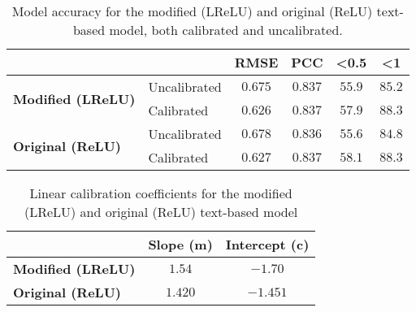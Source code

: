 \begin{table}[H]
    \centering
    \begin{tabular}{|l|l|c|c|c|c|}
        \hline
        \multicolumn{2}{|l|}{\textbf{}} & \textbf{RMSE} & \textbf{PCC} & \textbf{\textless 0.5} & \textbf{\textless 1}          \\ \hline
        \multirow{2}{*}{\textbf{Modified (LReLU)}}
                                        & Uncalibrated  & $0.675$      & $0.837$                & $55.9$               & $85.2$ \\ \cline{2-6}
                                        & Calibrated    & $0.626$      & $0.837$                & $57.9$               & $88.3$ \\ \hline
        \multirow{2}{*}{\textbf{Original (ReLU)}}
                                        & Uncalibrated  & $0.678$      & $0.836$                & $55.6$               & $84.8$ \\ \cline{2-6}
                                        & Calibrated    & $0.627$      & $0.837$                & $58.1$               & $88.3$ \\ \hline
    \end{tabular}
    \caption{Model accuracy for the modified (LReLU) and original (ReLU) text-based model, both calibrated and uncalibrated.}
    \label{tab:model_accuracy_lrelu}
\end{table}


\begin{table}[H]
    \centering
    \begin{tabular}{|l|c|c|}
        \hline
        \textbf{}                 & \textbf{Slope (m)} & \textbf{Intercept (c)} \\ \hline
        \textbf{Modified (LReLU)} & $1.54$             & $-1.70$                \\ \hline
        \textbf{Original (ReLU)}  & $1.420$            & $-1.451$               \\ \hline
    \end{tabular}
    \caption{Linear calibration coefficients for the modified (LReLU) and original (ReLU) text-based model}
    \label{tab:linear_regression_coefficients_lrelu}
\end{table}

